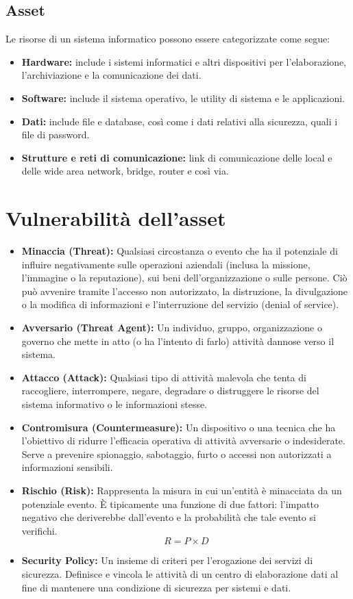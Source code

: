 \documentclass{article}
\begin{document}
\subsection*{Asset}
Le risorse di un sistema informatico possono essere categorizzate come segue:
\begin{itemize}
    \item \textbf{Hardware:} include i sistemi informatici e altri dispositivi per l'elaborazione, l'archiviazione e la comunicazione dei dati.
    \item \textbf{Software:} include il sistema operativo, le utility di sistema e le applicazioni.
    \item \textbf{Dati:} include file e database, così come i dati relativi alla sicurezza, quali i file di password.
    \item \textbf{Strutture e reti di comunicazione:} link di comunicazione delle local e delle wide area network, bridge, router e così via.
\end{itemize}

\section{Vulnerabilità dell'asset}
\begin{itemize}
    \item \textbf{Minaccia (Threat):} Qualsiasi circostanza o evento che ha il potenziale di influire negativamente sulle operazioni aziendali (inclusa la missione, l'immagine o la reputazione), sui beni dell'organizzazione o sulle persone. Ciò può avvenire tramite l'accesso non autorizzato, la distruzione, la divulgazione o la modifica di informazioni e l'interruzione del servizio (denial of service).
    \item \textbf{Avversario (Threat Agent):} Un individuo, gruppo, organizzazione o governo che mette in atto (o ha l'intento di farlo) attività dannose verso il sistema.
    \item \textbf{Attacco (Attack):} Qualsiasi tipo di attività malevola che tenta di raccogliere, interrompere, negare, degradare o distruggere le risorse del sistema informativo o le informazioni stesse.
    \item \textbf{Contromisura (Countermeasure):} Un dispositivo o una tecnica che ha l'obiettivo di ridurre l'efficacia operativa di attività avversarie o indesiderate. Serve a prevenire spionaggio, sabotaggio, furto o accessi non autorizzati a informazioni sensibili.
    \item \textbf{Rischio (Risk):} Rappresenta la misura in cui un'entità è minacciata da un potenziale evento. È tipicamente una funzione di due fattori: l'impatto negativo che deriverebbe dall'evento e la probabilità che tale evento si verifichi.
    \begin{equation*}
        R = P \times D
    \end{equation*}
    \item \textbf{Security Policy:} Un insieme di criteri per l'erogazione dei servizi di sicurezza. Definisce e vincola le attività di un centro di elaborazione dati al fine di mantenere una condizione di sicurezza per sistemi e dati.
\end{itemize}
\end{document}

